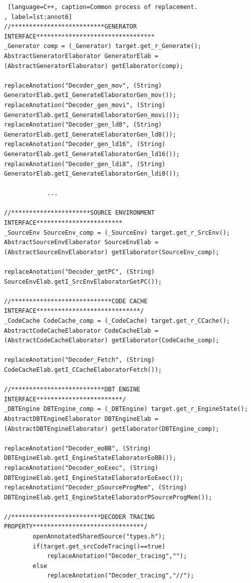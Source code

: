 \documentclass[12pt]{article}
\begin{document}
{\begin{lstlisting} [language=C++, caption=Common process of replacement.
, label=lst:annot6]
//**************************GENERATOR INTERFACE*********************************
_Generator comp = (_Generator) target.get_r_Generate();
AbstractGeneratorElaborator GeneratorElab = (AbstractGeneratorElaborator) getElaborator(comp);
        
replaceAnotation("Decoder_gen_mov", (String) GeneratorElab.getI_GenerateElaboratorGen_mov());
replaceAnotation("Decoder_gen_movi", (String) GeneratorElab.getI_GenerateElaboratorGen_movi());
replaceAnotation("Decoder_gen_ld8", (String) GeneratorElab.getI_GenerateElaboratorGen_ld8());
replaceAnotation("Decoder_gen_ld16", (String) GeneratorElab.getI_GenerateElaboratorGen_ld16());
replaceAnotation("Decoder_gen_ldi8", (String) GeneratorElab.getI_GenerateElaboratorGen_ldi8());

			...

//**********************SOURCE ENVIRONMENT INTERFACE************************				
_SourceEnv SourceEnv_comp = (_SourceEnv) target.get_r_SrcEnv();
AbstractSourceEnvElaborator SourceEnvElab = (AbstractSourceEnvElaborator) getElaborator(SourceEnv_comp);
		
replaceAnotation("Decoder_getPC", (String) SourceEnvElab.getI_SrcEnvElaboratorGetPC());	
				
//****************************CODE CACHE INTERFACE*****************************/
_CodeCache CodeCache_comp = (_CodeCache) target.get_r_CCache();
AbstractCodeCacheElaborator CodeCacheElab = (AbstractCodeCacheElaborator) getElaborator(CodeCache_comp);
		
replaceAnotation("Decoder_Fetch", (String) CodeCacheElab.getI_CCacheElaboratorFetch());	
			
//**************************DBT ENGINE INTERFACE************************/	
_DBTEngine DBTEngine_comp = (_DBTEngine) target.get_r_EngineState();
AbstractDBTEngineElaborator DBTEngineElab = (AbstractDBTEngineElaborator) getElaborator(DBTEngine_comp);		
		
replaceAnotation("Decoder_eoBB", (String) DBTEngineElab.getI_EngineStateElaboratorEoBB());
replaceAnotation("Decoder_eoExec", (String) DBTEngineElab.getI_EngineStateElaboratorEoExec());
replaceAnotation("Decoder_pSourceProgMem", (String) DBTEngineElab.getI_EngineStateElaboratorPSourceProgMem());
    
//*************************DECODER TRACING PROPERTY*******************************/
		openAnnotatedSharedSource("types.h");
		if(target.get_srcCodeTracing()==true)
			replaceAnotation("Decoder_tracing","");
		else
			replaceAnotation("Decoder_tracing","//");	
\end{lstlisting}

}
\end{document}
